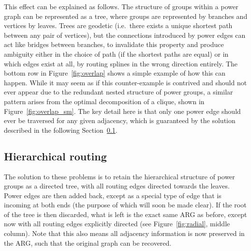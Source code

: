 This effect can be explained as follows. The structure of groups within a power graph can be represented as a tree, where groups are represented by branches and vertices by leaves.
Trees are geodetic (i.e.\ there exists a unique shortest path between any pair of vertices), but the connections introduced by power edges can act like bridges between branches, to invalidate this property and produce ambiguity either in the choice of path (if the shortest paths are equal) or in which edges exist at all, by routing splines in the wrong direction entirely.
The bottom row in Figure~\ref{fig:overlap} shows a simple example of how this can happen. While it may seem as if this counter-example is contrived and should not ever appear due to the redundant nested structure of power groups, a similar pattern arises from the optimal decomposition of a clique, shown in Figure~\ref{fig:overlap_sm}.
The key detail here is that only one power edge should ever be traversed for any given adjacency, which is guaranteed by the solution described in the following Section~\ref{sec:hierarchical_routing}.

\subsection{Hierarchical routing}
\label{sec:hierarchical_routing}

The solution to these problems is to retain the hierarchical structure of power groups as a directed tree, with all routing edges directed towards the leaves. Power edges are then added back, except as a special type of edge that is incoming at both ends (the purpose of which will soon be made clear). If the root of the tree is then discarded, what is left is the exact same ARG as before, except now with all routing edges explicitly directed (see Figure~\ref{fig:radial}, middle column).
Note that this also means all adjacency information is now preserved in the ARG, such that the original graph can be recovered.

